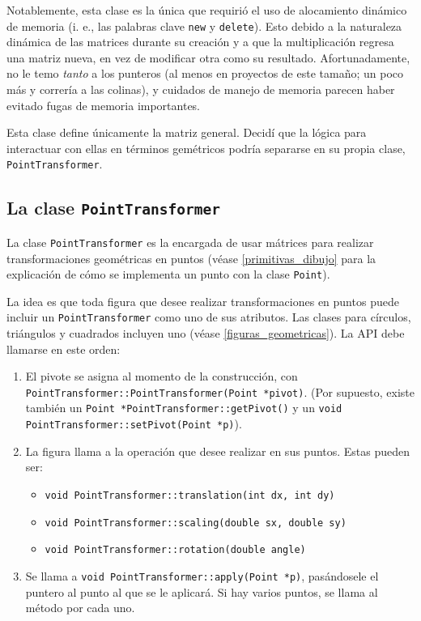 Notablemente, esta clase es la única que requirió el uso de alocamiento dinámico de
memoria (i. e., las palabras clave \lstinline!new! y \lstinline!delete!). Esto
debido a la naturaleza dinámica de las matrices durante su creación y a que la multiplicación
regresa una matriz nueva, en vez de modificar otra como su resultado. Afortunadamente,
no le temo \emph{tanto} a los punteros (al menos en proyectos de este tamaño; un poco
más y correría a las colinas), y cuidados de manejo de memoria parecen haber evitado
fugas de memoria importantes.

Esta clase define únicamente la matriz general. Decidí que la lógica para interactuar
con ellas en términos gemétricos podría separarse en su propia clase, \lstinline!PointTransformer!.

\subsection{La clase \lstinline!PointTransformer!}

La clase \lstinline!PointTransformer! es la encargada de usar mátrices para realizar
transformaciones geométricas en puntos (véase \ref{primitivas_dibujo} para la explicación
de cómo se implementa un punto con la clase \lstinline!Point!).

La idea es que toda figura que desee realizar transformaciones en puntos puede incluir un
\lstinline!PointTransformer! como uno de sus atributos. Las clases para círculos,
triángulos y cuadrados incluyen uno (véase \ref{figuras_geometricas}). La API debe llamarse
en este orden:
\begin{enumerate}
	\item El pivote se asigna al momento de la construcción, con
	\lstinline!PointTransformer::PointTransformer(Point *pivot)!. (Por supuesto,
	existe también un \lstinline!Point *PointTransformer::getPivot()! y un \lstinline!void PointTransformer::setPivot(Point *p)!).
	\item La figura llama a la operación que desee realizar en sus puntos. Estas pueden
	ser:
	\begin{itemize}
		\item \lstinline!void PointTransformer::translation(int dx, int dy)!
		\item \lstinline!void PointTransformer::scaling(double sx, double sy)!
		\item \lstinline!void PointTransformer::rotation(double angle)!
	\end{itemize}
	\item Se llama a \lstinline!void PointTransformer::apply(Point *p)!, pasándosele
	el puntero al punto al que se le aplicará. Si hay varios puntos, se llama
	al método por cada uno.
\end{enumerate}

